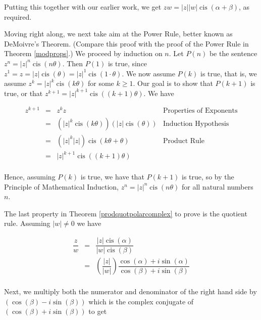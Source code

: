Putting this together with our earlier work, we get $zw = |z| |w| \operatorname{cis}(\alpha + \beta)$, as required.  

\smallskip

Moving right along, we next take aim at the Power Rule, better known  as DeMoivre's Theorem. (Compare this proof with the proof of the Power Rule in Theorem \ref{modprops}.) We proceed by induction on $n$. Let $P(n)$ be the sentence $z^{n} = |z|^{n} \operatorname{cis}(n \theta)$.  Then $P(1)$ is true, since $z^{1} = z = |z| \operatorname{cis}(\theta) = |z|^{1} \operatorname{cis}(1\cdot \theta)$.  We now assume $P(k)$ is true, that is, we assume  $z^{k} = |z|^{k} \operatorname{cis}(k \theta)$ for some $k \geq 1$. Our goal is to show that $P(k+1)$ is true, or that $z^{k+1} = |z|^{k+1} \operatorname{cis}((k+1)\theta)$. We have

\[ \begin{array}{rcll}

z^{k+1} & = & z^{k} z & \text{Properties of Exponents} \\[3pt]
				& = & \left(|z|^{k} \operatorname{cis}(k \theta)\right) \left(|z| \operatorname{cis}(\theta)\right) & \text{Induction Hypothesis}\\[3pt]
				& = & \left(|z|^k |z|\right) \operatorname{cis}(k \theta + \theta) & \text{Product Rule}\\[3pt]
				& = & |z|^{k+1} \operatorname{cis}((k+1)\theta) \\

\end{array} \] 

Hence, assuming $P(k)$ is true, we have that $P(k+1)$ is true, so by the Principle of Mathematical Induction, $z^{n} = |z|^{n} \operatorname{cis}(n \theta)$ for all natural numbers $n$. 

\smallskip

The last property in Theorem \ref{prodquotpolarcomplex} to prove is the quotient rule.   Assuming $|w| \neq 0$ we have

\[ \begin{array}{rcl}

\dfrac{z}{w} & = & \dfrac{|z| \operatorname{cis}(\alpha)}{|w| \operatorname{cis}(\beta)}  \\ [8pt]
						 & = & \left( \dfrac{|z|}{|w|}\right) \dfrac{\cos(\alpha) + i \sin(\alpha)}{\cos(\beta) + i \sin(\beta)}   \\ 		 \end{array}\]
						 
Next, we multiply both the numerator and denominator of the right hand side by $(\cos(\beta) - i \sin(\beta))$ which is the complex conjugate of $(\cos(\beta) + i \sin(\beta))$ to get

